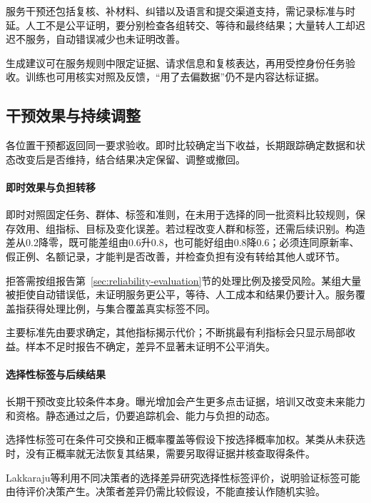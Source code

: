 服务干预还包括复核、补材料、纠错以及语言和提交渠道支持，需记录标准与时延。人工不是公平证明，要分别检查各组转交、等待和最终结果；大量转人工却迟迟不服务，自动错误减少也未证明改善。

生成建议可在服务规则中限定证据、请求信息和复核表达，再用受控身份任务验收。训练也可用核实对照及反馈，“用了去偏数据”仍不是内容达标证据。

\subsection{干预效果与持续调整}
\label{sec:fairness-intervention-evaluation}
\label{sec:fairness-long-term}

各位置干预都返回同一要求验收。即时比较确定当下收益，长期跟踪确定数据和状态改变后是否维持，结合结果决定保留、调整或撤回。

\paragraph{即时效果与负担转移}

即时对照固定任务、群体、标签和准则，在未用于选择的同一批资料比较规则，保存效用、组指标、目标及变化误差。若过程改变人群和标签，还需后续识别。构造差从0.2降零，既可能差组由0.6升0.8，也可能好组由0.8降0.6；必须连同原新率、假正例、名额记录，才能判是否改善，并检查负担有没有转给其他人或环节。

拒答需按组报告第~\ref{sec:reliability-evaluation}节的处理比例及接受风险。某组大量被拒使自动错误低，未证明服务更公平，等待、人工成本和结果仍要计入。服务覆盖指获得处理比例，与集合覆盖真实标签不同。

主要标准先由要求确定，其他指标揭示代价；不断挑最有利指标会只显示局部收益。样本不足时报告不确定，差异不显著未证明不公平消失。

\paragraph{选择性标签与后续结果}

长期干预改变比较条件本身。曝光增加会产生更多点击证据，培训又改变未来能力和资格。静态通过之后，仍要追踪机会、能力与负担的动态。

选择性标签可在条件可交换和正概率覆盖等假设下按选择概率加权。某类从未获选时，没有正概率就无法恢复其结果，需要另取得证据并核查取得条件。

Lakkaraju等利用不同决策者的选择差异研究选择性标签评价，说明验证标签可能由待评价决策产生。决策者差异仍需比较假设，不能直接认作随机实验。

